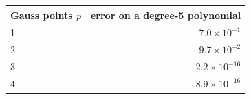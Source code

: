 \begin{tabular}{lr}
\toprule
Gauss points $p$ & error on a degree-5 polynomial \\
\midrule
1 & $7.0\times10^{-1}$ \\
2 & $9.7\times10^{-2}$ \\
3 & $2.2\times10^{-16}$ \\
4 & $8.9\times10^{-16}$ \\
\bottomrule
\end{tabular}

